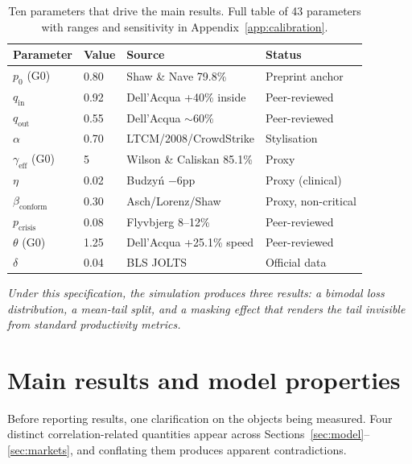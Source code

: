 \documentclass[11pt,a4paper]{article}
\newcommand{\bridgeskip}{\vspace{6pt}}
\begin{document}
\begin{table}[h!]
\centering\small
\setlength{\tabcolsep}{6pt}
\renewcommand{\arraystretch}{1.30}
\begin{tabular}{@{}llll@{}}
\toprule
\textbf{Parameter} & \textbf{Value} & \textbf{Source} & \textbf{Status} \\
\midrule
$p_0$ (G0)     & 0.80  & Shaw \& Nave 79.8\%         & Preprint anchor \\
$q_{\text{in}}$  & 0.92  & Dell'Acqua +40\% inside     & Peer-reviewed \\
$q_{\text{out}}$ & 0.55  & Dell'Acqua $\sim$60\%       & Peer-reviewed \\
$\alpha$         & 0.70  & LTCM/2008/CrowdStrike       & Stylisation \\
$\gamma_{\text{eff}}$ (G0) & 5 & Wilson \& Caliskan 85.1\% & Proxy \\
$\eta$           & 0.02  & Budzy\'{n} $-6$pp           & Proxy (clinical) \\
$\beta_{\text{conform}}$ & 0.30 & Asch/Lorenz/Shaw     & Proxy, non-critical \\
$p_{\text{crisis}}$ & 0.08 & Flyvbjerg 8--12\%         & Peer-reviewed \\
$\theta$ (G0)    & 1.25  & Dell'Acqua +25.1\% speed    & Peer-reviewed \\
$\delta$         & 0.04  & BLS JOLTS                    & Official data \\
\bottomrule
\end{tabular}
\caption{Ten parameters that drive the main results. Full table of 43
parameters with ranges and sensitivity in Appendix~\ref{app:calibration}.}
\label{tab:params}
\end{table}

\bridgeskip
\noindent\textit{Under this specification, the simulation produces three
results: a bimodal loss distribution, a mean-tail split, and a masking
effect that renders the tail invisible from standard productivity metrics.}

\section{Main results and model properties}\label{sec:results}

Before reporting results, one clarification on the objects being measured.
Four distinct correlation-related quantities appear across
Sections~\ref{sec:model}--\ref{sec:markets}, and conflating them produces
apparent contradictions.
\end{document}

